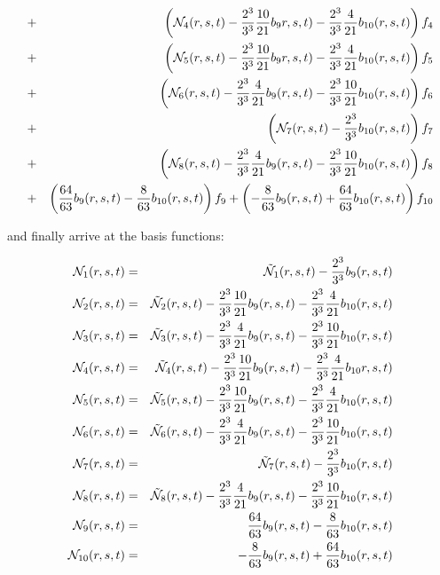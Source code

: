 \begin{eqnarray}
&+& \left( {\mathcal{N}}_4(r,s,t) -\frac{2^3}{3^3}\frac{10}{21} b_{9}r,s,t) -\frac{2^3}{3^3}\frac{4}{21} b_{10}(r,s,t)\right)f_4 \nonumber\\ 
&+&\left( {\mathcal{N}}_5(r,s,t)- \frac{2^3}{3^3}\frac{10}{21} b_{9}r,s,t) -\frac{2^3}{3^3}\frac{4}{21} b_{10}(r,s,t) \right) f_5 \nonumber\\
&+&\left( {\mathcal{N}}_6(r,s,t) -\frac{2^3}{3^3}\frac{4}{21} b_9(r,s,t) -\frac{2^3}{3^3}\frac{10}{21} b_{10}(r,s,t) \right) f_6 \nonumber\\
&+&\left( {\mathcal{N}}_7(r,s,t) - \frac{2^3}{3^3}b_{10}(r,s,t) \right) f_7 \nonumber\\
&+&\left( {\mathcal{N}}_8(r,s,t) -\frac{2^3}{3^3}\frac{4}{21} b_9(r,s,t) -\frac{2^3}{3^3}\frac{10}{21} b_{10}(r,s,t) \right) f_8 \nonumber\\
&+& \left(  \frac{64}{63}b_9(r,s,t) -\frac{8}{63} b_{10}(r,s,t) \right) f_9 
+ \left( -\frac{8}{63} b_{9}(r,s,t)  + \frac{64}{63}b_{10}(r,s,t) \right) f_{10} 
\end{eqnarray}

and finally arrive at the basis functions:
\begin{mdframed}[backgroundcolor=blue!5]
\begin{eqnarray}
{\mathcal{N}}_1(r,s,t)    &=&  \tilde{{\mathcal{N}}}_1(r,s,t) - \frac{2^3}{3^3}b_9(r,s,t)      \nonumber\\
{\mathcal{N}}_2(r,s,t)    &=&  \tilde{{\mathcal{N}}}_2(r,s,t) - \frac{2^3}{3^3}\frac{10}{21} b_9(r,s,t) - \frac{2^3}{3^3}\frac{4}{21} b_{10}(r,s,t)      \nonumber\\
{\mathcal{N}}_3(r,s,t)    &=&  \tilde{{\mathcal{N}}}_3(r,s,t)  -\frac{2^3}{3^3}\frac{4}{21} b_9(r,s,t) -\frac{2^3}{3^3}\frac{10}{21} b_{10}(r,s,t)      \nonumber\\
{\mathcal{N}}_4(r,s,t)    &=&  \tilde{{\mathcal{N}}}_4(r,s,t) -\frac{2^3}{3^3}\frac{10}{21} b_{9}(r,s,t) -\frac{2^3}{3^3}\frac{4}{21} b_{10}r,s,t)      \nonumber\\
{\mathcal{N}}_5(r,s,t)    &=&  \tilde{{\mathcal{N}}}_5(r,s,t)- \frac{2^3}{3^3}\frac{10}{21} b_{9}(r,s,t) -\frac{2^3}{3^3}\frac{4}{21} b_{10}(r,s,t)      \nonumber\\
{\mathcal{N}}_6(r,s,t)    &=&  \tilde{{\mathcal{N}}}_6(r,s,t) -\frac{2^3}{3^3}\frac{4}{21} b_9(r,s,t) -\frac{2^3}{3^3}\frac{10}{21} b_{10}(r,s,t)      \nonumber\\
{\mathcal{N}}_7(r,s,t)    &=&  \tilde{{\mathcal{N}}}_7(r,s,t) - \frac{2^3}{3^3}b_{10}(r,s,t)      \nonumber\\
{\mathcal{N}}_8(r,s,t)    &=&  \tilde{{\mathcal{N}}}_8(r,s,t) -\frac{2^3}{3^3}\frac{4}{21} b_9(r,s,t) -\frac{2^3}{3^3}\frac{10}{21} b_{10}(r,s,t)      \nonumber\\
{\mathcal{N}}_9(r,s,t)    &=&  \frac{64}{63}b_9(r,s,t) -\frac{8}{63} b_{10}(r,s,t)      \nonumber\\
{\mathcal{N}}_{10}(r,s,t) &=&  -\frac{8}{63} b_{9}(r,s,t)  + \frac{64}{63}b_{10}(r,s,t)       \nonumber
\end{eqnarray}
\end{mdframed}


